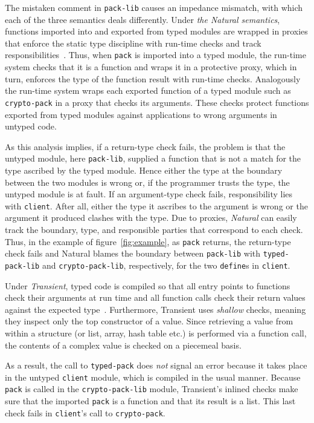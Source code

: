 The mistaken comment in {\tt pack-lib} causes an impedance mismatch, with which each
of the three semantics deals differently.  Under {\it the Natural semantics\/},
functions imported into and exported from typed modules are wrapped in proxies that
enforce the static type discipline with run-time checks and track
responsibilities~\citep{tf-popl-2008, tfffgksst-snapl-2017}. Thus, when {\tt pack}
is imported into a typed module, the run-time system checks that it is a function
and wraps it in a protective proxy, which in turn, enforces the type of the function
result with run-time checks.  Analogously the run-time system wraps each exported
function of a typed module such as {\tt crypto-pack} in a proxy that checks its
arguments.  These checks protect functions exported from typed modules against
applications to wrong arguments in untyped code.

As this analysis implies, if a return-type check fails, the problem is
that the untyped module, here {\tt pack-lib}, supplied a function that is not a
match for the type ascribed by the typed module.
Hence either the type at the boundary between the two modules is wrong or, 
if the programmer trusts the type, the untyped module is at fault.
If an argument-type check fails, responsibility  lies with
{\tt client}. After all, either the type it ascribes to the argument is
wrong or the argument it produced clashes with the type. Due to 
proxies, {\it Natural\/} can easily track the 
boundary, type, and responsible parties that correspond to each check. 
Thus, in the example of figure~\ref{fig:example}, as
\texttt{pack} returns, the return-type check fails and Natural blames
the boundary between \texttt{pack-lib} with {\tt typed-pack-lib} and
{\tt crypto-pack-lib}, respectively, for the two {\tt define}s in {\tt client}.

Under {\it Transient\/}, typed code is compiled so that all entry points to
functions check their arguments at run time and all function calls check their
return values against the expected type~\citep{vss-popl-2017}.  Furthermore,
Transient uses \emph{shallow} checks, meaning they inspect only the top
constructor of a value. Since retrieving a value from within a structure (or
list, array, hash table etc.) is performed via a function call, the contents of
a complex value is checked on a piecemeal basis.

As a result, the call to \texttt{typed-pack} does {\em not\/} signal an error
because it takes place in the untyped {\tt client} module, which is compiled in
the usual manner. Because {\tt pack} is called in the {\tt crypto-pack-lib}
module, Transient's inlined checks make sure that the imported
\texttt{pack} is a function and that its result is a list. This
last check fails in \texttt{client}'s call to {\tt crypto-pack}.

